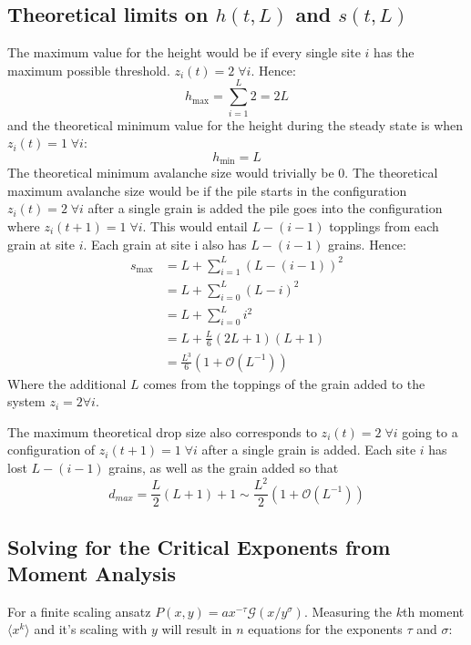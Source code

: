 \documentclass[twoside]{article}
\begin{document}
\subsection{Theoretical limits on $h(t,L)$ and $s(t,L)$}
The maximum value for the height would be if every single site $i$ has the maximum possible threshold. $z_i (t) = 2 \; \forall i$. Hence:
\[
h_{\text{max}} = \sum_{i=1}^L 2 = 2L
\]
and the theoretical minimum value for the height during the steady state is when $z_i (t) = 1 \; \forall i$:
\[
h_{\text{min}} = L
\]
The theoretical minimum avalanche size would trivially be 0. The theoretical maximum avalanche size would be if the pile starts in the configuration $z_i (t) = 2 \; \forall i$ after a single grain is added the pile goes into the configuration where $z_i (t+1) = 1 \; \forall i$. This would entail $L-(i-1)$ topplings from each grain at site $i$. Each grain at site i also has $L-(i-1)$ grains. Hence:
\begin{align*}
s_{\text{max}}& = L+ \sum_{i=1}^L (L-(i-1))^2 \\
&=L+ \sum_{i=0}^L (L-i)^2\\
&= L+ \sum_{i=0}^L i^2 \\
&= L+ \frac{L}{6} (2L+1) (L+1) \\
&= \frac{L^3}{6} ( 1 + \mathcal{O}(L^{-1} ) )
\end{align*}
Where the additional $L$ comes from the toppings of the grain added to the system $z_i = 2 \forall i$. 

	The maximum theoretical drop size also corresponds to $z_i (t) = 2 \; \forall i$ going to a configuration of $z_i (t+1) = 1 \; \forall i$ after a single grain is added. Each site $i$ has lost $L-(i-1)$ grains, as well as the grain added so that
\[
d_{max} = \frac{L}{2} (L+1) + 1\sim \frac{L^2}{2} ( 1 + \mathcal{O}(L^{-1} ) )
\]

\subsection{Solving for the Critical Exponents from Moment Analysis}
For a finite scaling ansatz $P(x,y) = a x^{-\tau} \mathcal{G} (x/ y^{\sigma} )$.
Measuring the $k$th moment $\langle x^k \rangle$ and it's scaling with $y$ will result in $n$ equations for the exponents $\tau$ and $\sigma$:
\end{document}
